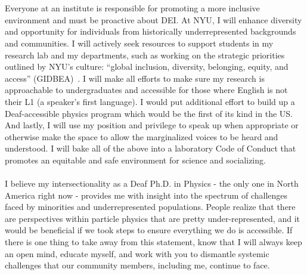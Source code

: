 \documentclass[10pt,a4paper,sans]{moderncv} %
\begin{document}
\\
\\
Everyone at an institute is responsible for promoting a more inclusive environment and must be proactive about DEI. At NYU, I will enhance diversity and opportunity for individuals from historically underrepresented backgrounds and communities. I will actively seek resources to support students in my research lab and my departments, such as working on the strategic priorities outlined by NYU's culture: ``global inclusion, diversity, belonging, equity, and access'' (GIDBEA)~\cite{campusplan}. I will make all efforts to make sure my research is approachable to undergraduates and accessible for those where English is not their L1 (a speaker's first language). I would put additional effort to build up a Deaf-accessible physics program which would be the first of its kind in the US. And lastly, I will use my position and privilege to speak up when appropriate or otherwise make the space to allow the marginalized voices to be heard and understood. I will bake all of the above into a laboratory Code of Conduct that promotes an equitable and safe environment for science and socializing.
\\
\\
I believe my intersectionality as a Deaf Ph.D. in Physics - the only one in North America right now - provides me with insight into the spectrum of challenges faced by minorities and underrepresented populations. People realize that there are perspectives within particle physics that are pretty under-represented, and it would be beneficial if we took steps to ensure everything we do is accessible. If there is one thing to take away from this statement, know that I will always keep an open mind, educate myself, and work with you to dismantle systemic challenges that our community members, including me, continue to face.

\printbibliography
\end{document}
